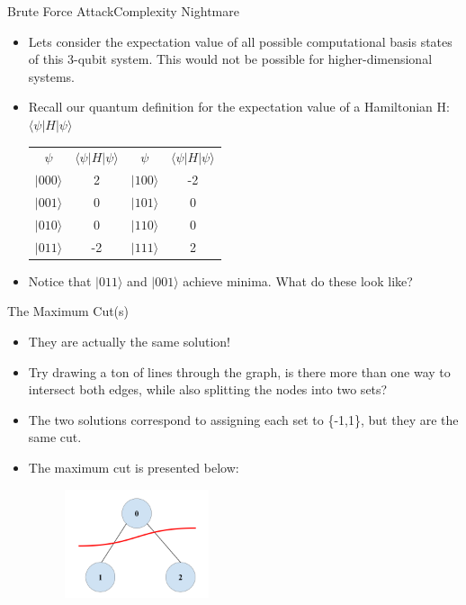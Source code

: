 \begin{frame}{Brute Force Attack}{Complexity Nightmare}
    \begin{itemize}
        \item Lets consider the expectation value of all possible computational basis states of this 3-qubit system. This would not be possible for higher-dimensional systems.
        \item Recall our quantum definition for the expectation value of a Hamiltonian H: $\langle \psi | H | \psi \rangle$
        \begin{center}
            \begin{tabular}{c|c|c|c}
                 $\psi$ & $\langle \psi | H | \psi \rangle$ & $\psi$ & $\langle \psi | H | \psi \rangle$ \\

                 $|000\rangle$ & 2 & $|100 \rangle$ & -2 \\
                 $|001\rangle$ & 0 & $|101 \rangle$ & 0 \\
                 $|010 \rangle$ & 0 & $|110\rangle$ & 0 \\
                 $|011\rangle$ & -2 & $|111\rangle$ & 2
            \end{tabular}
        \end{center}
        \vspace{2 mm}
        \item Notice that $|011\rangle$ and $|001\rangle$ achieve minima. What do these look like?
    \end{itemize}
\end{frame}

\begin{frame}{The Maximum Cut(s)}
    \begin{itemize}
        \item They are actually the same solution!
        \item Try drawing a ton of lines through the graph, is there more than one way to intersect both edges, while also splitting the nodes into two sets?
        \item The two solutions correspond to assigning each set to \{-1,1\}, but they are the same cut.
        \item The maximum cut is presented below:
        \begin{figure}[h]
    \centering
    \includegraphics[width=0.4\textwidth]{400/Graph_MC_Cut_max.png}
    
\end{figure}
    \end{itemize}
\end{frame}


